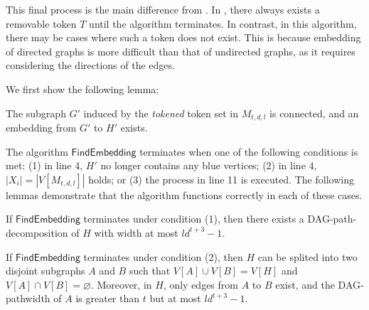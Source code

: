 \documentclass[runningheads]{llncs}
\theoremstyle{plain}
\theoremstyle{definition}
\begin{document}
This final process is the main difference from \cite{art8}. In \cite{art8}, there always exists a removable token $T$ until the algorithm terminates. In contrast, in this algorithm, there may be cases where such a token does not exist. This is because embedding of directed graphs is more difficult than that of undirected graphs, as it requires considering the directions of the edges.  


We first show the following lemma:

\begin{lemma}\label{lemma_embedding}
    The subgraph $G'$ induced by the \textit{tokened} token set in $M_{t, d, l}$ is connected, and an embedding from $G'$ to $H'$ exists.
\end{lemma}




The algorithm $\mathsf{FindEmbedding}$ terminates when one of the following conditions is met: (1) in line 4, $H'$ no longer contains any blue vertices; (2) in line 4, $|X_i| = |V[M_{t, d, l}]|$ holds; or (3) the process in line 11 is executed. The following lemmas demonstrate that the algorithm functions correctly in each of these cases.

\begin{lemma}\label{lemma_(1)}
    If $\mathsf{FindEmbedding}$ terminates under condition (1), then there exists a DAG-path-decomposition of $H$ with width at most $ld^{t+3}-1$.
\end{lemma}


\begin{lemma}\label{lemma_(2)}
    If $\mathsf{FindEmbedding}$ terminates under condition (2), then $H$ can be splited into two disjoint subgraphs $A$ and $B$ such that $V[A] \cup V[B] = V[H]$ and $V[A] \cap V[B] = \varnothing$. Moreover, in $H$, only edges from $A$ to $B$ exist, and the DAG-pathwidth of $A$ is greater than $t$ but at most $ld^{t+3}-1$.
\end{lemma}
\end{document}
